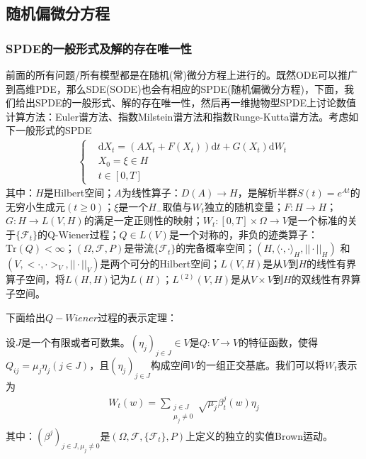     \subsection{随机偏微分方程}
        \subsubsection{SPDE的一般形式及解的存在唯一性}
            \par
            前面的所有问题/所有模型都是在随机(常)微分方程上进行的。既然ODE可以推广到高维PDE，那么SDE(SODE)也会有相应的SPDE(随机偏微分方程)，下面，我们给出SPDE的一般形式、解的存在唯一性，然后再一维抛物型SPDE上讨论数值计算方法：Euler谱方法、指数Milstein谱方法和指数Runge-Kutta谱方法。考虑如下一般形式的SPDE
            \begin{align*}
                \left\{
                    \begin{aligned}
                    &\mathrm{d}X_t = (AX_t +F(X_t))\mathrm{d}t + G(X_t)\mathrm{d}W_t\\
                    &X_0 = \xi \in H\\
                    &t\in [0,T]
                    \end{aligned}
                \right.
            \end{align*}
            其中：$H$是Hilbert空间；$A$为线性算子：$D(A)\rightarrow H$，是解析半群$S(t) = e^{At}$的无穷小生成元$(t \geqslant 0)$；$\xi$是一个$H_-$取值与$W_t$独立的随机变量；$F:H\rightarrow H$；$G:H\rightarrow L(V,H)$的满足一定正则性的映射；$W_t:[0,T]\times \Omega \rightarrow V$是一个标准的关于$\{\mathcal{F}_t\}$的Q-Wiener过程；$Q\in L(V)$是一个对称的，非负的迹类算子：$\mathrm{Tr}(Q) < \infty$；$(\Omega,\mathcal{F},P)$是带流$\{\mathcal{F}_t\}$的完备概率空间；$(H,\langle\cdot ,\cdot\rangle_H,||\cdot||_H)$ 和$(V,\bigl<\cdot ,\cdot\bigr>_V,||\cdot||_V)$是两个可分的Hilbert空间；$L(V,H)$是从$V$到$H$的线性有界算子空间，将$L(H,H)$记为$L(H)$；$L^{(2)}(V,H)$是从$V\times V$到$H$的双线性有界算子空间。
            \par
            下面给出$Q-Wiener$过程的表示定理：
            \begin{theorem}[表示定理]
                设$J$是一个有限或者可数集。$(\eta_j)_{j\in J} \in V$是$Q:V\rightarrow V$的特征函数，使得$Q_{ij} = \mu_j\eta_j(j \in J)$，且$(\eta_j)_{j\in J} $构成空间$V$的一组正交基底。我们可以将$W_t$表示为
                \begin{align*}
                    W_t(w) = \sum_{\substack{j\in J \\ \mu _j \neq 0}} \sqrt{\mu_j}\beta_t^j(w)\eta_j
                \end{align*}
                其中：$(\beta^j)_{j\in J,\mu_j \neq 0}$是$(\Omega,\mathcal{F},\{\mathcal{F}_t\},P)$上定义的独立的实值Brown运动。
            \end{theorem}
